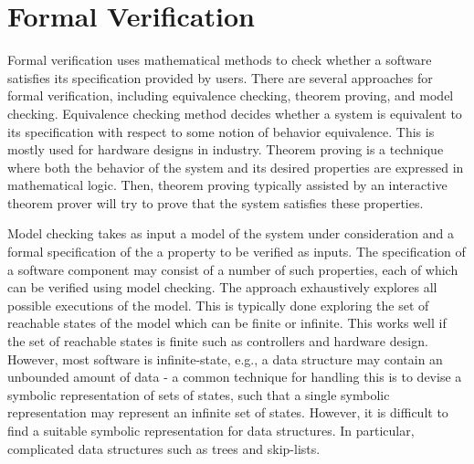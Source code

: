 \section{Formal Verification} 
Formal verification uses mathematical methods to check whether a software  satisfies its specification  provided by users. 
There are several approaches for  formal verification, including equivalence checking, theorem proving, and model checking. Equivalence checking method decides whether a system is equivalent to its specification with respect to some notion of behavior  equivalence. This is mostly used for hardware designs in industry. Theorem proving is a technique where both the behavior of the system and its desired properties are expressed in mathematical logic. Then, theorem proving  typically assisted by an interactive theorem prover  will try to prove that the system satisfies these properties. 

Model checking takes as input a model of the system  under
consideration and a formal specification of the a property to be verified as inputs. The specification of a software component may consist of a number of such properties, each of which can be verified using model checking. The approach exhaustively explores all possible executions of the model. This is typically done exploring the set of reachable states of the model  which can be finite or infinite. 
This works well if the set of reachable states is finite such as  controllers and hardware design.   However, most software is infinite-state, e.g., a data structure may contain an unbounded amount of data - a common technique for handling this is to devise a symbolic representation of sets of states, such that a single symbolic representation may represent  an infinite set of states.  However, it is difficult to find a suitable symbolic representation for data structures. In particular, complicated data structures such as trees and skip-lists.


